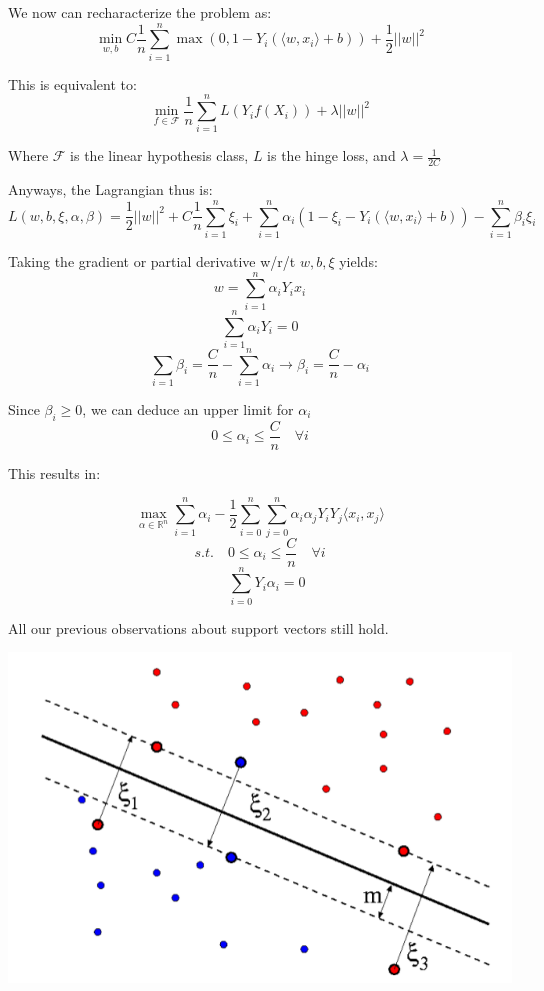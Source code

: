 \documentclass{minimal}
\begin{document}
We now can recharacterize the problem as:
$$
\min_{w, b} C \frac{1}{n} \sum_{i=1}^n \max(0, 1 - Y_i(\langle w, x_i \rangle +
b)) + \frac{1}{2}||w||^2
$$

This is equivalent to:
$$
\min_{f \in \mathcal{F}} \frac{1}{n} \sum_{i=1}^n L(Y_i f(X_i)) + \lambda
||w||^2
$$

Where $\mathcal{F}$ is the linear hypothesis class, $L$ is the hinge loss, and
$\lambda=\frac{1}{2C}$

\medskip

Anyways, the Lagrangian thus is:
$$
L(w, b, \xi, \alpha, \beta) = 
\frac{1}{2} ||w||^2 + 
C \frac{1}{n} \sum_{i=1}^n \xi_i +
\sum_{i=1}^n \alpha_i(1 - \xi_i - Y_i (\langle w, x_i \rangle + b)) -
\sum_{i=1}^n \beta_i \xi_i
$$

Taking the gradient or partial derivative w/r/t $w, b, \xi$ yields:
$$
w = \sum_{i=1}^n \alpha_i Y_i x_i
$$
$$
\sum_{i=1}^n \alpha_i Y_i = 0
$$
$$
\sum_{i=1}\beta_i = \frac{C}{n} - \sum_{i=1}^n \alpha_i \to \beta_i = \frac{C}{n} - \alpha_i
$$

Since $\beta_i \geq 0$, we can deduce an upper limit for $\alpha_i$
$$
0 \leq \alpha_i \leq \frac{C}{n} \quad \forall i
$$

This results in:

$$
\max_{\alpha \in \mathbb{R}^n} 
\sum_{i=1}^n \alpha_i - \frac{1}{2} \sum_{i=0}^n \sum_{j=0}^n \alpha_i \alpha_j Y_i Y_j \langle x_i, x_j \rangle
$$
$$
s.t. \quad 0 \leq \alpha_i \leq \frac{C}{n} \quad \forall i
$$
$$
\quad \sum_{i=0}^n Y_i \alpha_i = 0
$$

All our previous observations about support vectors still hold.

\includegraphics[scale=0.25]{soft.png}
\end{document}
